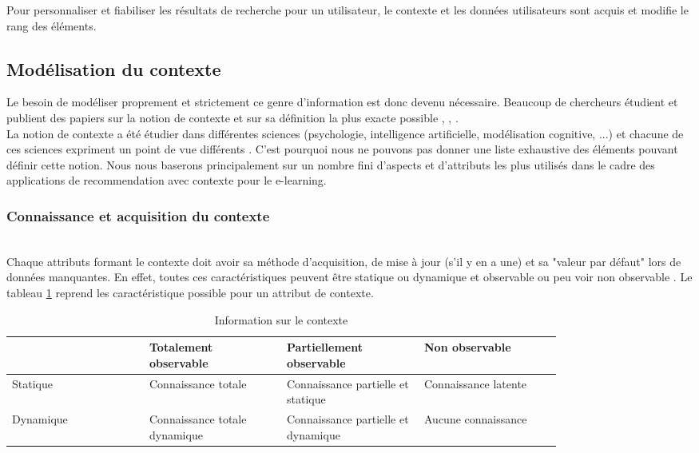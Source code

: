 \documentclass[conference]{./sty/IEEEtran}
\begin{document}
Pour personnaliser et fiabiliser les résultats de recherche pour un
utilisateur, le contexte et les données utilisateurs sont acquis et modifie le
rang des éléments. \\

\subsection{Modélisation du contexte}

Le besoin de modéliser proprement et strictement ce genre d'information est
donc devenu nécessaire. Beaucoup de chercheurs étudient et publient des papiers
sur la notion de contexte et sur sa définition la plus exacte possible
\cite{DBLP:journals/tlt/VerbertMOWDBD12},
\cite{DBLP:reference/rsh/AdomaviciusT11},
\cite{DBLP:journals/aim/AdomaviciusMRT11}. \\

La notion de contexte a été étudier dans différentes sciences (psychologie,
intelligence artificielle, modélisation cognitive, ...) et chacune de ces
sciences expriment un point de vue différents
\cite{DBLP:reference/rsh/AdomaviciusT11}. C'est pourquoi nous ne pouvons pas
donner une liste exhaustive des éléments pouvant définir cette notion. Nous
nous baserons principalement sur un nombre fini d'aspects et d'attributs les
plus utilisés dans le cadre des applications de recommendation avec contexte
pour le e-learning. \\


\subsubsection{Connaissance et acquisition du contexte}
~\\
Chaque attributs formant le contexte doit avoir sa méthode d'acquisition, de
mise à jour (s'il y en a une) et sa "valeur par défaut" lors de données
manquantes. En effet, toutes ces caractéristiques peuvent être statique ou
dynamique et observable ou peu voir non observable
\cite{DBLP:journals/aim/AdomaviciusMRT11}. Le tableau
\ref{tab:update_observability_context} reprend les caractéristique possible
pour un attribut de contexte. \\

\begin{table}
  \caption{\label{tab:update_observability_context} Information sur le contexte \cite{DBLP:journals/aim/AdomaviciusMRT11}}
  \begin{tabular}{|p{0.20\linewidth}|p{0.20\linewidth}|p{0.20\linewidth}|p{0.20\linewidth}|}
    \hline
    ~ & Totalement observable & Partiellement observable & Non observable \\ \hline
    Statique & Connaissance totale & Connaissance partielle et statique & Connaissance latente \\ \hline
    Dynamique & Connaissance totale dynamique & Connaissance partielle et dynamique & Aucune connaissance \\ \hline
  \end{tabular}
\end{table}
\end{document}
